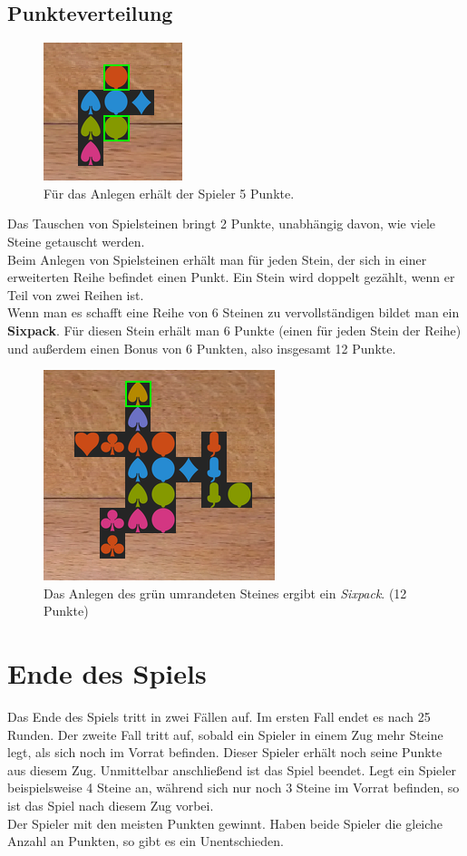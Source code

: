 \documentclass[a4paper, ngerman]{scrartcl}
\begin{document}
\subsection{Punkteverteilung}

\begin{figure}
	\centering	
		\includegraphics[scale = 0.7]{images/anlegen04}
		\caption{Für das Anlegen erhält der Spieler 5 Punkte.}
		\label{fig:Punkte1}	
\end{figure}
Das Tauschen von Spielsteinen bringt 2 Punkte, unabhängig davon, wie viele Steine getauscht werden.\\
Beim Anlegen von Spielsteinen erhält man für jeden Stein, der sich in einer erweiterten Reihe befindet einen Punkt. Ein Stein wird doppelt gezählt, wenn er Teil von zwei Reihen ist.\\
Wenn man es schafft eine Reihe von 6 Steinen zu vervollständigen bildet man ein \textbf{Sixpack}. Für diesen Stein erhält man 6 Punkte (einen für jeden Stein der Reihe) und außerdem einen Bonus von 6 Punkten, also insgesamt 12 Punkte.
\begin{figure}[h]
\centering
	\includegraphics[scale = 0.7]{images/sixpack_legen}
		\caption{Das Anlegen des grün umrandeten Steines ergibt ein \emph{Sixpack}. (12 Punkte)}
		\label{fig:PunkteSixpack}	
\end{figure}
	
\section{Ende des Spiels}
\label{sec:gameOver}
Das Ende des Spiels tritt in zwei Fällen auf. Im ersten Fall endet es nach 25 Runden. Der zweite Fall tritt auf, sobald ein Spieler in einem Zug mehr Steine legt, als sich noch im Vorrat befinden. Dieser Spieler erhält noch seine Punkte aus diesem Zug. Unmittelbar anschließend ist das Spiel beendet. Legt ein Spieler beispielsweise 4 Steine an, während sich nur noch 3 Steine im Vorrat befinden, so ist das Spiel nach diesem Zug vorbei.\\
Der Spieler mit den meisten Punkten gewinnt. Haben beide Spieler die gleiche Anzahl an Punkten, so gibt es ein Unentschieden.
\end{document}
